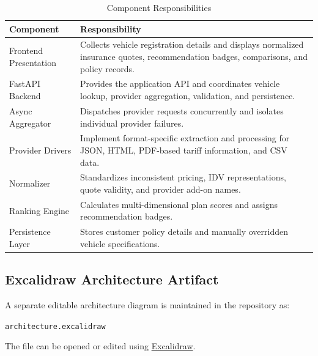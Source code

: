 \documentclass[11pt,a4paper]{article}
\begin{document}
\begin{table}[H]
\centering
\caption{Component Responsibilities}
\begin{tabularx}{\textwidth}{L{4cm}Y}
\toprule
\textbf{Component} & \textbf{Responsibility} \\
\midrule

Frontend Presentation &
Collects vehicle registration details and displays normalized
insurance quotes, recommendation badges, comparisons, and
policy records. \\

FastAPI Backend &
Provides the application API and coordinates vehicle lookup,
provider aggregation, validation, and persistence. \\

Async Aggregator &
Dispatches provider requests concurrently and isolates individual
provider failures. \\

Provider Drivers &
Implement format-specific extraction and processing for JSON,
HTML, PDF-based tariff information, and CSV data. \\

Normalizer &
Standardizes inconsistent pricing, IDV representations,
quote validity, and provider add-on names. \\

Ranking Engine &
Calculates multi-dimensional plan scores and assigns
recommendation badges. \\

Persistence Layer &
Stores customer policy details and manually overridden
vehicle specifications. \\

\bottomrule
\end{tabularx}
\end{table}

\subsection{Excalidraw Architecture Artifact}

A separate editable architecture diagram is maintained in the
repository as:

\begin{center}
\colorbox{CodeBg}{
    \texttt{architecture.excalidraw}
}
\end{center}

The file can be opened or edited using
\href{https://excalidraw.com}{Excalidraw}.
\end{document}
